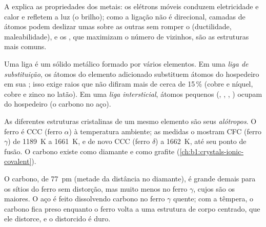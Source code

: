 \begin{proposition}\label{prop:b1:crystals-metals:properties}
A  explica as propriedades dos metais: os elétrons
móveis conduzem eletricidade e calor e refletem a luz (o brilho); como a
ligação não é direcional, camadas de átomos podem deslizar umas sobre as
outras sem romper o  (ductilidade, maleabilidade), e os
, que maximizam o número de vizinhos, são as
estruturas mais comuns.
\end{proposition}
\admitted

\begin{definition}[Ligas]\label{def:b1:crystals-metals:alloy}
Uma liga é um sólido metálico formado por vários elementos. Em uma
\emph{liga de substituição}, os átomos do
elemento adicionado substituem átomos do hospedeiro em sua ; isso
exige raios que não difiram mais de cerca de 15\,\% (cobre e níquel,
cobre e zinco no latão). Em uma \emph{liga intersticial},
átomos pequenos (, , , ) ocupam  do hospedeiro (o carbono no aço).
\end{definition}

\begin{definition}[Alotropia]\label{def:b1:crystals-metals:allotropy}
As diferentes estruturas cristalinas de um mesmo elemento são seus
\emph{alótropos}. O ferro é CCC (ferro $\alpha$) à temperatura
ambiente; as medidas o mostram CFC (ferro $\gamma$) de \qty{1189}{K} a
\qty{1661}{K}, e de novo CCC (ferro $\delta$) a \qty{1662}{K}, até seu
ponto de fusão. O carbono existe como diamante e como grafite
(\cref{ch:b1:crystals-ionic-covalent}).
\end{definition}

\begin{example}[O aço]\label{ex:b1:crystals-metals:steel}
O carbono, de  \qty{77}{pm} (metade da distância 
no diamante), é grande demais para os sítios do ferro sem distorção, mas
muito menos no ferro $\gamma$, cujos  são os maiores. O
aço é feito dissolvendo carbono no ferro $\gamma$ quente; com a têmpera,
o carbono fica preso enquanto o ferro volta a uma estrutura de corpo
centrado, que ele distorce, e o  distorcido é duro.
\end{example}

